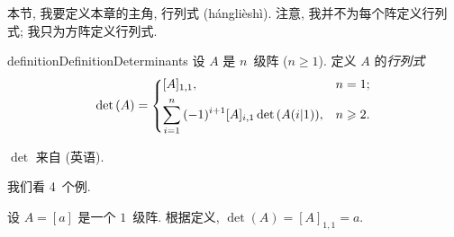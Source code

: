 \documentclass[../libro.tex]{subfiles}
\begin{document}
本节, 我要定义本章的主角, 行列式 (hánglièshì).
注意, 我并不为每个阵定义行列式;
我只为方阵定义行列式.

\begin{restatable}[行列式]{definition}{DefinitionDeterminants}
    设 \(A\) 是 \(n\)~级阵 (\(n \geq 1\)).
    定义 \(A\) 的\emph{行列式}
    \begin{align*}
        \det {(A)} =
        \begin{dcases}
            [A]_{1,1},                                               & n = 1; \\
            \sum_{i = 1}^{n} {(-1)^{i+1} [A]_{i,1} \det {(A(i|1))}}, & n \geq 2.
        \end{dcases}
    \end{align*}
\end{restatable}

\(\det\) 来自  (英语).

我们看 4~个例.

\begin{example}
    设 \(A = [a]\) 是一个 \(1\)~级阵.
    根据定义, \(\det {(A)} = [A]_{1,1} = a\).
\end{example}
\end{document}
